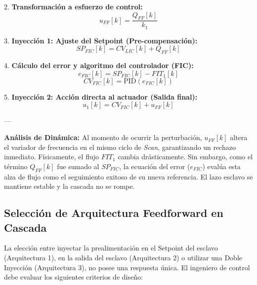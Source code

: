  2. \textbf{Transformación a esfuerzo de control:}
   $$u_{FF}[k] = \frac{Q_{FF}[k]}{k_1}$$

 3. \textbf{Inyección 1: Ajuste del Setpoint (Pre-compensación):}
   $$SP_{FIC}[k] = CV_{LIC}[k] + Q_{FF}[k]$$

 4. \textbf{Cálculo del error y algoritmo del controlador (FIC):}
   $$e_{FIC}[k] = SP_{FIC}[k] - FIT_1[k]$$
   $$CV_{FIC}[k] = \text{PID}(e_{FIC}[k])$$

   5. \textbf{Inyección 2: Acción directa al actuador (Salida final):}
   $$u_1[k] = CV_{FIC}[k] + u_{FF}[k]$$

---

\textbf{Análisis de Dinámica:} Al momento de ocurrir la perturbación, $u_{FF}[k]$ altera el variador de frecuencia en el mismo ciclo de \textit{Scan}, garantizando un rechazo inmediato. Físicamente, el flujo $FIT_1$ cambia drásticamente. Sin embargo, como el término $Q_{FF}[k]$ fue sumado al $SP_{FIC}$, la ecuación del error ($e_{FIC}$) evalúa esta alza de flujo como el seguimiento exitoso de su nueva referencia. El lazo esclavo se mantiene estable y la cascada no se rompe.


\subsection{Selección de Arquitectura Feedforward en Cascada}

La elección entre inyectar la prealimentación en el Setpoint del esclavo (Arquitectura 1), en la salida del esclavo (Arquitectura 2) o utilizar una Doble Inyección (Arquitectura 3), no posee una respuesta única. El ingeniero de control debe evaluar los siguientes criterios de diseño:

